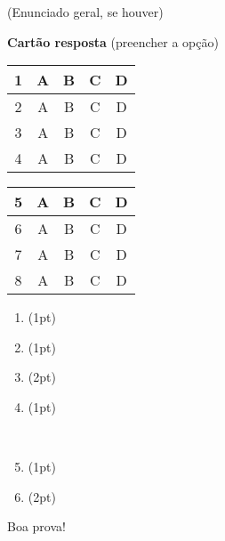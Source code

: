 \documentclass[a4paper]{article}
\begin{document}
(Enunciado geral, se houver)
\vspace{0.5cm}


\begin{multicols}{2}
{\bf Cartão resposta} (preencher a opção)

\begin{tabular}[!b]{|c|c|c|c|c|}
  \hline
  1 & A & B & C & D\\
  \hline
  2 & A & B & C & D\\
  \hline
  3 & A & B & C & D\\
  \hline
  4& A & B & C & D\\
  \hline
\end{tabular}
\begin{tabular}[!b]{|c|c|c|c|c|}
  \hline
  5 & A & B & C & D\\
  \hline
  6 & A & B & C & D\\
  \hline
  7& A & B & C & D\\
  \hline
  8 & A & B & C & D\\
  \hline
\end{tabular}

\begin{enumerate}
\item (1pt) 

\vspace{2cm}
\item (1pt) 

\vspace{3cm}
\item (2pt) 

\vspace{4cm}
\item  (1pt) 

\vspace{3cm}
{\ }
\columnbreak

\item  (1pt) 

\vspace{5cm}
\item  (2pt) 


\vfill
\end{enumerate}
\end{multicols}
\vfill
\begin{center}Boa prova!\end{center}
\end{document}
